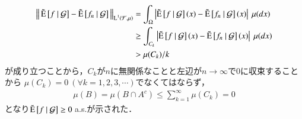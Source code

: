 \begin{prf}
\begin{description}
				\begin{align}
					\left\|\, \tilde{\operatorname{E}} \left[ f \ \middle|\ \mathcal{G} \right] - \tilde{\operatorname{E}} \left[ f_n \ \middle|\ \mathcal{G} \right]\, \right\|_{\operatorname{L}^{1} \left(\mathcal{F},\mu\right)}
					&= \int_\Omega \left| \tilde{\operatorname{E}} \left[ f \ \middle|\ \mathcal{G} \right](x) - \tilde{\operatorname{E}} \left[ f_n \ \middle|\ \mathcal{G} \right](x) \right|\ \mu(dx) \\
					&\geq \int_{C_k} \left| \tilde{\operatorname{E}} \left[ f \ \middle|\ \mathcal{G} \right](x) - \tilde{\operatorname{E}} \left[ f_n \ \middle|\ \mathcal{G} \right](x) \right|\ \mu(dx) \\
					&> \mu(C_k)/k
				\end{align}
				が成り立つことから，$C_k$が$n$に無関係なことと左辺が$n \longrightarrow \infty$で0に収束することから
				$\mu(C_k) = 0 \ (\forall k = 1,2,3,\cdots)$でなくてはならず，
				\begin{align}
					\mu(B) = \mu(B \cap A^c) \leq \sum_{k=1}^{\infty} \mu(C_k) = 0
				\end{align}
				となり$\tcexp{f}{\mathcal{G}} \geq 0\ $a.s.が示された．
				

\end{description}
\end{prf}
